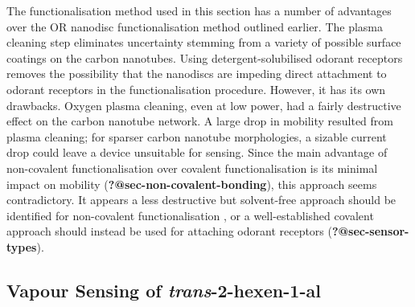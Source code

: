 \documentclass[
  a4paper,
]{scrbook}
\begin{document}
The functionalisation method used in this section has a number of
advantages over the OR nanodisc functionalisation method outlined
earlier. The plasma cleaning step eliminates uncertainty stemming from a
variety of possible surface coatings on the carbon nanotubes. Using
detergent-solubilised odorant receptors removes the possibility that the
nanodiscs are impeding direct attachment to odorant receptors in the
functionalisation procedure. However, it has its own drawbacks. Oxygen
plasma cleaning, even at low power, had a fairly destructive effect on
the carbon nanotube network. A large drop in mobility resulted from
plasma cleaning; for sparser carbon nanotube morphologies, a sizable
current drop could leave a device unsuitable for sensing. Since the main
advantage of non-covalent functionalisation over covalent
functionalisation is its minimal impact on mobility
(\textbf{?@sec-non-covalent-bonding}), this approach seems
contradictory. It appears a less destructive but solvent-free approach
should be identified for non-covalent functionalisation
\autocite{Ashraf2014}, or a well-established covalent approach should
instead be used for attaching odorant receptors
(\textbf{?@sec-sensor-types}).

\hypertarget{vapour-sensing-of-trans-2-hexen-1-al}{%
\subsection{\texorpdfstring{Vapour Sensing of
\emph{trans}-2-hexen-1-al}{Vapour Sensing of trans-2-hexen-1-al}}\label{vapour-sensing-of-trans-2-hexen-1-al}}
\end{document}
